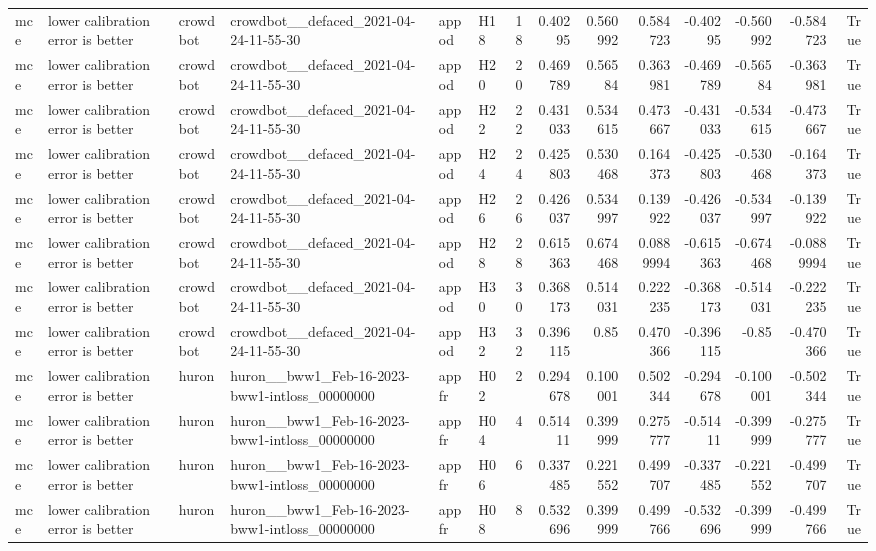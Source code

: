 \begin{longtable}{llllllrrrrrrrr}
mce & lower calibration error is better & crowdbot & crowdbot\_\_defaced\_2021-04-24-11-55-30 & appod & H18 & 18 & 0.40295 & 0.560992 & 0.584723 & -0.40295 & -0.560992 & -0.584723 & True \\
mce & lower calibration error is better & crowdbot & crowdbot\_\_defaced\_2021-04-24-11-55-30 & appod & H20 & 20 & 0.469789 & 0.56584 & 0.363981 & -0.469789 & -0.56584 & -0.363981 & True \\
mce & lower calibration error is better & crowdbot & crowdbot\_\_defaced\_2021-04-24-11-55-30 & appod & H22 & 22 & 0.431033 & 0.534615 & 0.473667 & -0.431033 & -0.534615 & -0.473667 & True \\
mce & lower calibration error is better & crowdbot & crowdbot\_\_defaced\_2021-04-24-11-55-30 & appod & H24 & 24 & 0.425803 & 0.530468 & 0.164373 & -0.425803 & -0.530468 & -0.164373 & True \\
mce & lower calibration error is better & crowdbot & crowdbot\_\_defaced\_2021-04-24-11-55-30 & appod & H26 & 26 & 0.426037 & 0.534997 & 0.139922 & -0.426037 & -0.534997 & -0.139922 & True \\
mce & lower calibration error is better & crowdbot & crowdbot\_\_defaced\_2021-04-24-11-55-30 & appod & H28 & 28 & 0.615363 & 0.674468 & 0.0889994 & -0.615363 & -0.674468 & -0.0889994 & True \\
mce & lower calibration error is better & crowdbot & crowdbot\_\_defaced\_2021-04-24-11-55-30 & appod & H30 & 30 & 0.368173 & 0.514031 & 0.222235 & -0.368173 & -0.514031 & -0.222235 & True \\
mce & lower calibration error is better & crowdbot & crowdbot\_\_defaced\_2021-04-24-11-55-30 & appod & H32 & 32 & 0.396115 & 0.85 & 0.470366 & -0.396115 & -0.85 & -0.470366 & True \\
mce & lower calibration error is better & huron & huron\_\_bww1\_Feb-16-2023-bww1-intloss\_00000000 & appfr & H02 & 2 & 0.294678 & 0.100001 & 0.502344 & -0.294678 & -0.100001 & -0.502344 & True \\
mce & lower calibration error is better & huron & huron\_\_bww1\_Feb-16-2023-bww1-intloss\_00000000 & appfr & H04 & 4 & 0.51411 & 0.399999 & 0.275777 & -0.51411 & -0.399999 & -0.275777 & True \\
mce & lower calibration error is better & huron & huron\_\_bww1\_Feb-16-2023-bww1-intloss\_00000000 & appfr & H06 & 6 & 0.337485 & 0.221552 & 0.499707 & -0.337485 & -0.221552 & -0.499707 & True \\
mce & lower calibration error is better & huron & huron\_\_bww1\_Feb-16-2023-bww1-intloss\_00000000 & appfr & H08 & 8 & 0.532696 & 0.399999 & 0.499766 & -0.532696 & -0.399999 & -0.499766 & True \\

\end{longtable}
